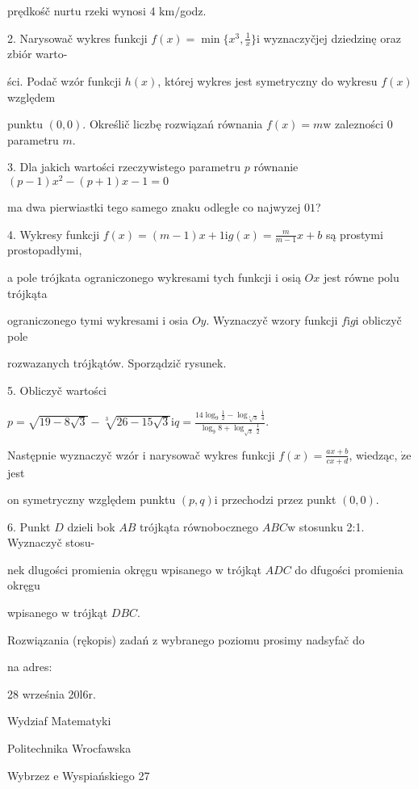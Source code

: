 \documentclass[a4paper,12pt]{article}
\begin{document}
prędkośč nurtu rzeki wynosi 4 $\mathrm{k}\mathrm{m}/$godz.

2. Narysowač wykres funkcji $f(x)=\displaystyle \min\{x^{3},\frac{1}{x}\}\mathrm{i}$ wyznaczyčjej dziedzinę oraz zbiór warto-

ści. Podač wzór funkcji $h(x)$, której wykres jest symetryczny do wykresu $f(x)$ względem

punktu $(0,0)$. Określič liczbę rozwiązań równania $f(x)=m\mathrm{w}$ zalezności $0$ parametru $m.$

3. Dla jakich wartości rzeczywistego parametru $p$ równanie $(p-1)x^{2}-(p+1)x-1=0$

ma dwa pierwiastki tego samego znaku odległe co najwyzej $01$?

4. Wykresy funkcji $f(x)=(m-1)x+1\displaystyle \mathrm{i}g(x)=\frac{m}{m-1}x+b$ są prostymi prostopadłymi,

a pole trójkata ograniczonego wykresami tych funkcji $\mathrm{i}$ osią $Ox$ jest równe polu trójkąta

ograniczonego tymi wykresami $\mathrm{i}$ osia $Oy$. Wyznaczyč wzory funkcji $f\mathrm{i}g\mathrm{i}$ obliczyč pole

rozwazanych trójkątów. Sporządzič rysunek.

5. Obliczyč wartości

$p=\displaystyle \sqrt{19-8\sqrt{3}}-\sqrt[3]{26-15\sqrt{3}}\mathrm{i}q=\frac{14\log_{9}\frac{1}{2}-\log_{\sqrt[3]{3}}\frac{1}{4}}{\log_{9}8+\log_{\sqrt{3}}\frac{1}{2}}.$

Następnie wyznaczyč wzór $\mathrm{i}$ narysowač wykres funkcji $f(x) =\displaystyle \frac{ax+b}{cx+d}$, wiedząc, $\dot{\mathrm{z}}\mathrm{e}$ jest

on symetryczny względem punktu $(p,q)\mathrm{i}$ przechodzi przez punkt $(0,0).$

6. Punkt $D$ dzieli bok $AB$ trójkąta równobocznego $ABC\mathrm{w}$ stosunku 2:1. Wyznaczyč stosu-

nek dlugości promienia okręgu wpisanego $\mathrm{w}$ trójkąt $ADC$ do dfugości promienia okręgu

wpisanego $\mathrm{w}$ trójkąt $DBC.$

Rozwiązania (rękopis) zadań z wybranego poziomu prosimy nadsyfač do

na adres:

28 września 20l6r.

Wydziaf Matematyki

Politechnika Wrocfawska

Wybrzez $\mathrm{e}$ Wyspiańskiego 27
\end{document}
